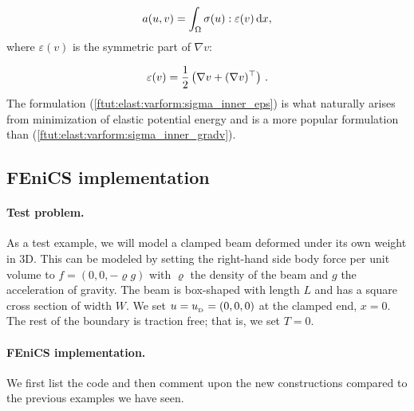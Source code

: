 \documentclass[graybox,envcountchap,sectrefs,final]{svmonodo}
\begin{document}
\begin{equation}
a(u,v) = \int_\Omega\sigma(u) :\varepsilon(v) \dx,
\label{ftut:elast:varform:sigma_inner_eps}
\end{equation}
where $\varepsilon(v)$ is the symmetric part of $\nabla v$:

\[ \varepsilon(v) = \frac{1}{2}\left(\nabla v + (\nabla v)^{\top}\right)\tp\]
The formulation (\ref{ftut:elast:varform:sigma_inner_eps}) is what naturally
arises from minimization of elastic potential energy and is a more
popular formulation than (\ref{ftut:elast:varform:sigma_inner_gradv}).




\subsection{FEniCS implementation}

\paragraph{Test problem.}
As a test example, we will model a clamped beam deformed under its
own weight in 3D. This can be modeled by setting the right-hand side
body force per unit volume to $f=(0,0,-\varrho g)$ with $\varrho$ the
density of the beam and $g$ the acceleration of gravity. The beam is
box-shaped with length $L$ and has a square cross section of width $W$. We
set $u=\ub = (0,0,0)$ at the clamped end, $x=0$. The rest of the boundary is
traction free; that is, we set $T = 0$.

\paragraph{FEniCS implementation.}
We first list the code and then comment upon the new constructions
compared to the previous examples we have seen.
\end{document}
